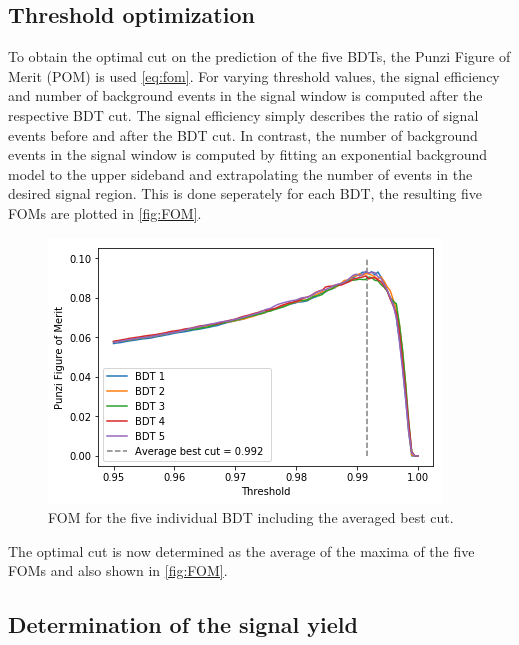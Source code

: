\subsection{Threshold optimization}

To obtain the optimal cut on the prediction of the five BDTs, the Punzi Figure of Merit (POM) is used \eqref{eq:fom}.
For varying threshold values, the signal efficiency and number of background events in the signal window is computed after the respective BDT cut.
The signal efficiency simply describes the ratio of signal events before and after the BDT cut. In contrast, the number of background events in the signal
window is computed by fitting an exponential background model to the upper sideband and extrapolating the number of events in the desired signal region.
This is done seperately for each BDT, the resulting five FOMs are plotted in \autoref{fig:FOM}.
\begin{figure}[H]
	\centering
	\includegraphics[width=0.6\linewidth]{plots/FOM.png}
	\caption{FOM for the five individual BDT including the averaged best cut.}
	\label{fig:FOM}
\end{figure}
The optimal cut is now determined as the average of the maxima of the five FOMs and also shown in \autoref{fig:FOM}.

\subsection{Determination of the signal yield}

